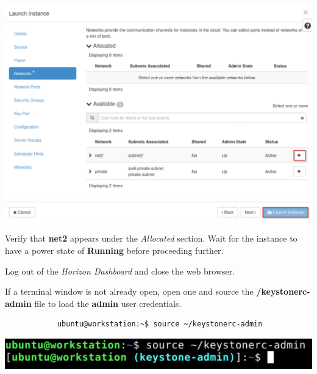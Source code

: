 \documentclass[letterpaper, 12pt]{article}
\begin{document}
\begin{enumerate}
\begin{labstep}
        \begin{center}
            \includegraphics[width=\linewidth]{images/part4/step6.png}
        \end{center}
    \end{labstep}

    \begin{stopbox}
        Verify that \textbf{net2} appears under the \textit{Allocated} section.
        Wait for the instance to have a power state of \textbf{Running} before proceeding further.
    \end{stopbox}

    \begin{labstep}
        Log out of the \textit{Horizon Dashboard} and close the web browser.
    \end{labstep}

    \begin{labstep}
        If a terminal window is not already open, open one and source the \textbf{\texttildemid/keystonerc-admin} file to load the \textbf{admin} user credentials.
        \begin{lstlisting}
            ubuntu@workstation:~$ source ~/keystonerc-admin
        \end{lstlisting}

        \begin{center}
            \includegraphics[width=\linewidth]{images/part4/step8.png}
        \end{center}
    \end{labstep}


\end{enumerate}
\end{document}
